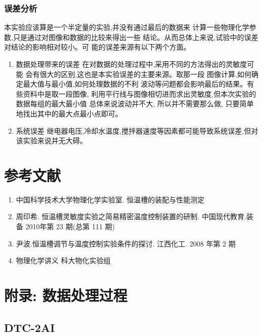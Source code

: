 \documentclass[11pt]{report}
\begin{document}
\section{误差分析}
\label{sec:orgec92fa8}
本实验应该算是一个半定量的实验,并没有通过最后的数据来
计算一些物理化学参数,只是通过对图像和数据的比较来得出一些
结论。从而总体上来说,试验中的误差对结论的影响相对较小。可
能的误差来源有以下两个方面。
\begin{enumerate}
\item 数据处理带来的误差
\label{sec:orga09bc36}
在对数据的处理过程中,采用不同的方法得出的灵敏度可能
会有很大的区别,这也是本实验误差的主要来源。取那一段
图像计算,如何确定最大值与最小值,如何处理数据的不利
波动等问题都会影响最后的结果。有些资料中是取一段图像,
利用平行线与图像相切进而求出灵敏度,但本次实验的数据每组的最大最小值
总体来说波动并不大, 所以并不需要那么做, 只要简单地找出其中的最大点最小点即可。


\item 系统误差
\label{sec:org39cd534}
继电器电压,冷却水温度,搅拌器速度等因素都可能导致系统误差,但对该实验来说并无大碍。
\end{enumerate}


\part{参考文献}
\label{sec:org780ca1d}
\begin{enumerate}
\item 中国科学技术大学物理化学实验室. 恒温槽的装配与性能测定
\item 周印希. 恒温槽灵敏度实验之简易精密温度控制装置的研制. 中国现代教育.装备 2010年第 23 期(总第 111 期)
\item 尹波.恒温槽调节与温度控制实验条件的探讨. 江西化工. 2008 年第 2 期
\item 物理化学讲义 科大物化实验组
\end{enumerate}


\part{附录: 数据处理过程}
\label{sec:orgffa929c}
\chapter{DTC-2AI}
\label{sec:orgcd14c6d}
\end{document}
